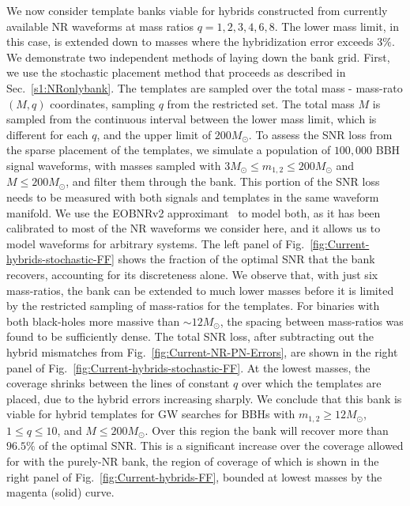 \documentclass[aps,
prd,
twocolumn,
superscriptaddress,
lengthcheck,showpacs,letterpaper,nofootinbib,
floatfix]{revtex4-1}
\begin{document}
We now consider template banks viable for hybrids constructed from currently 
available NR waveforms at mass ratios $q=1,2,3,4,6,8$. The lower mass limit,
in this case, is extended down to masses where the hybridization error 
exceeds $3\%$. We demonstrate two independent methods of laying
down the bank grid. First, we use the stochastic placement method that proceeds
as described in Sec.~\ref{s1:NRonlybank}. The templates are sampled over the
total mass - mass-rato $(M,q)$ coordinates, sampling $q$ from the restricted
set. The total mass $M$ is sampled from the continuous interval between the 
lower mass limit, which is different for each $q$, and the upper limit of
$200M_\odot$. To assess the SNR loss from the sparse placement
of the templates, we simulate a population of $100,000$ BBH signal waveforms,
with masses sampled with $3M_\odot\leq m_{1,2}\leq 200M_\odot$ and 
$M\leq 200M_\odot$, and filter them through the bank. This portion of the SNR
loss needs to be measured with both signals and templates in the same waveform
manifold. We use the EOBNRv2 approximant~\cite{BuonannoEOBv2Main} to model both, 
as it has been calibrated to most of the NR waveforms we consider here, and it
allows us to model waveforms for arbitrary systems. The left panel of
Fig.~\ref{fig:Current-hybrids-stochastic-FF} shows the
fraction of the optimal SNR that the bank recovers, accounting for its 
discreteness alone. We observe that, with just six mass-ratios, the bank 
can be extended to much lower masses before it is limited by the restricted
sampling of mass-ratios for the templates. For binaries with both black-holes 
more massive than $\sim 12M_\odot$, the spacing between mass-ratios was found 
to be sufficiently dense. The total SNR loss, after subtracting out 
the hybrid mismatches from Fig.~\ref{fig:Current-NR-PN-Errors}, are shown in 
the right panel of Fig.~\ref{fig:Current-hybrids-stochastic-FF}. 
At the lowest masses, the coverage shrinks between the lines of constant $q$ 
over which the templates are placed, due to the hybrid errors increasing 
sharply. We conclude that this bank is viable for hybrid templates for GW 
searches for BBHs with $m_{1,2}\geq 12M_\odot$, $1\leq q\leq 10$, and 
$M\leq 200M_\odot$. Over this region the bank will recover more than $96.5\%$
of the optimal SNR. This is a significant increase over the coverage allowed 
for with the purely-NR bank, the region of coverage of which is shown in the 
right panel of Fig.~\ref{fig:Current-hybrids-FF}, bounded at lowest masses by 
the magenta (solid) curve.
\end{document}
